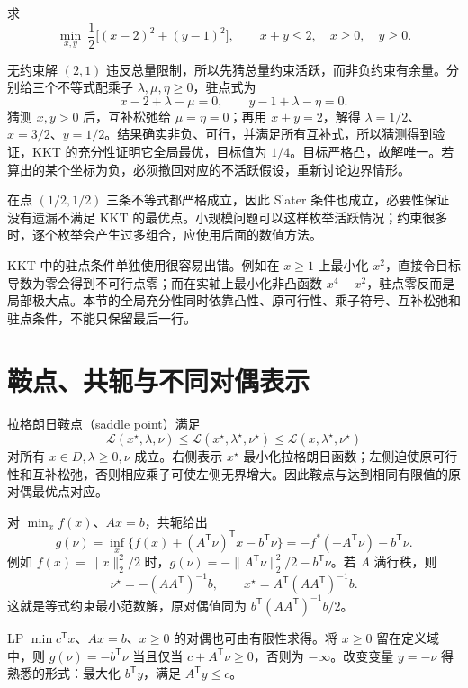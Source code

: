 \begin{example}
\label{ex:co-active-constraints}
求
\[
 \min_{x,y}\ \frac12\bigl[(x-2)^2+(y-1)^2\bigr],
 \qquad x+y\leq2,\quad x\geq0,\quad y\geq0.
\]
\end{example}
\begin{solve}
无约束解 $(2,1)$ 违反总量限制，所以先猜总量约束活跃，而非负约束有余量。分别给三个不等式配乘子 $\lambda,\mu,\eta\geq0$，驻点式为
\[
 x-2+\lambda-\mu=0,\qquad
 y-1+\lambda-\eta=0.
\]
猜测 $x,y>0$ 后，互补松弛给 $\mu=\eta=0$；再用 $x+y=2$，解得 $\lambda=1/2$、$x=3/2$、$y=1/2$。结果确实非负、可行，并满足所有互补式，所以猜测得到验证，KKT 的充分性证明它全局最优，目标值为 $1/4$。目标严格凸，故解唯一。若算出的某个坐标为负，必须撤回对应的不活跃假设，重新讨论边界情形。

在点 $(1/2,1/2)$ 三条不等式都严格成立，因此 Slater 条件也成立，必要性保证没有遗漏不满足 KKT 的最优点。小规模问题可以这样枚举活跃情况；约束很多时，逐个枚举会产生过多组合，应使用后面的数值方法。
\end{solve}

KKT 中的驻点条件单独使用很容易出错。例如在 $x\geq1$ 上最小化 $x^2$，直接令目标导数为零会得到不可行点零；而在实轴上最小化非凸函数 $x^4-x^2$，驻点零反而是局部极大点。本节的全局充分性同时依靠凸性、原可行性、乘子符号、互补松弛和驻点条件，不能只保留最后一行。

\section{鞍点、共轭与不同对偶表示}

拉格朗日鞍点（saddle point）满足
\[
 \mathcal L(x^\star,\lambda,\nu)
 \leq\mathcal L(x^\star,\lambda^\star,\nu^\star)
 \leq\mathcal L(x,\lambda^\star,\nu^\star)
\]
对所有 $x\in D,\lambda\geq0,\nu$ 成立。右侧表示 $x^\star$ 最小化拉格朗日函数；左侧迫使原可行性和互补松弛，否则相应乘子可使左侧无界增大。因此鞍点与达到相同有限值的原对偶最优点对应。

对 $\min_x f(x)$、$Ax=b$，共轭给出
\[
 g(\nu)=\inf_x\{f(x)+(A^{\mathsf T}\nu)^{\mathsf T}x-b^{\mathsf T}\nu\}
       =-f^*(-A^{\mathsf T}\nu)-b^{\mathsf T}\nu.
\]
例如 $f(x)=\|x\|_2^2/2$ 时，$g(\nu)=-\|A^{\mathsf T}\nu\|_2^2/2-b^{\mathsf T}\nu$。若 $A$ 满行秩，则
\[
 \nu^\star=-(AA^{\mathsf T})^{-1}b,\qquad
 x^\star=A^{\mathsf T}(AA^{\mathsf T})^{-1}b.
\]
这就是等式约束最小范数解，原对偶值同为 $b^{\mathsf T}(AA^{\mathsf T})^{-1}b/2$。

LP $\min c^{\mathsf T}x$、$Ax=b$、$x\geq0$ 的对偶也可由有限性求得。将 $x\geq0$ 留在定义域中，则 $g(\nu)=-b^{\mathsf T}\nu$ 当且仅当 $c+A^{\mathsf T}\nu\geq0$，否则为 $-\infty$。改变变量 $y=-\nu$ 得熟悉的形式：最大化 $b^{\mathsf T}y$，满足 $A^{\mathsf T}y\leq c$。

